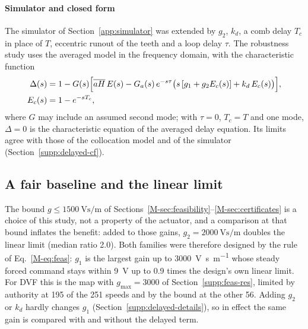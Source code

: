 \paragraph{Simulator and closed form}
The simulator of Section~\ref{app:simulator} was extended by $g_2$, $k_d$, a comb delay $T_c$ in place of $T$, eccentric runout of the teeth and a loop delay $\tau$. The robustness study uses the averaged model in the frequency domain, with the characteristic function
\begin{equation}\label{eq:comb-char}
  \begin{aligned}
    \Delta(s)&=1-G(s)\Bigl[\overline{aH}\,E(s)-G_a(s)\,e^{-s\tau}\bigl(s\,[g_1+g_2E_c(s)]+k_d\,E_c(s)\bigr)\Bigr],\\
    E_c(s)&=1-e^{-sT_c},
  \end{aligned}
\end{equation}
where $G$ may include an assumed second mode; with $\tau=0$, $T_c=T$ and one mode, $\Delta=0$ is the characteristic equation of the averaged delay equation. Its limits agree with those of the collocation model and of the simulator (Section~\ref{supp:delayed-cf}).

\subsection{A fair baseline and the linear limit}\label{supp:delayed-limit}

The bound $g\le\SI{1500}{\volt\second\per\metre}$ of Sections~\ref{M-sec:feasibility}--\ref{M-sec:certificates} is a choice of this study, not a property of the actuator, and a comparison at that bound inflates the benefit: added to those gains, $g_2=\SI{2000}{\volt\second\per\metre}$ doubles the linear limit (median ratio 2.0). Both families were therefore designed by the rule of Eq.~\eqref{M-eq:feas}: $g_1$ is the largest gain up to \SI{3000}{\volt\second\per\metre} whose steady forced command stays within \SI{9}{\volt} up to 0.9 times the design's own linear limit. For DVF this is the map with $g_{\max}=3000$ of Section~\ref{supp:feas-res}, limited by authority at 195 of the 251 speeds and by the bound at the other 56. Adding $g_2$ or $k_d$ hardly changes $g_1$ (Section~\ref{supp:delayed-details}), so in effect the same gain is compared with and without the delayed term.

